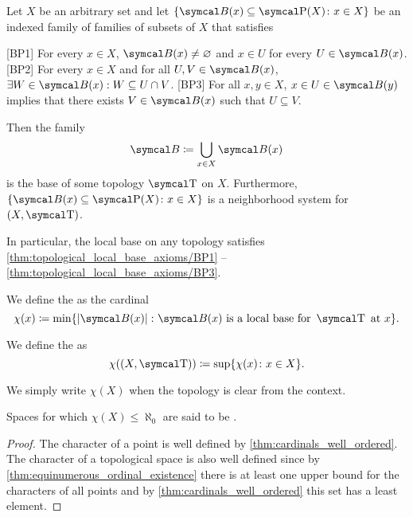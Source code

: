 \begin{proposition}\label{thm:topological_local_base_axioms}\cite[13]{Engelking1989}
  Let \( X \) be an arbitrary set and let \( \{ \Cal{B}(x) \subseteq \Power(X) \colon x \in X \} \) be an indexed family of families of subsets of \( X \) that satisfies
  \begin{description}
    [BP1] For every \( x \in X \), \( \Cal{B}(x) \neq \varnothing \) and \( x \in U \) for every \( U \in \Cal{B}(x) \).
    [BP2] For every \( x \in X \) and for all \( U, V \in \Cal{B}(x) \), \( \exists W \in \Cal{B}(x): W \subseteq U \cap V \).
    [BP3] For all \( x, y \in X \), \( x \in U \in \Cal{B}(y) \) implies that there exists \( V \in \Cal{B}(x) \) such that \( U \subseteq V \).
  \end{description}

  Then the family
  \begin{equation*}
    \Cal{B} \coloneqq \bigcup_{x \in X} \Cal{B}(x)
  \end{equation*}
  is the base of some topology \( \CT \) on \( X \). Furthermore, \( \{ \Cal{B}(x) \subseteq \Power(X) \colon x \in X \} \) is a neighborhood system for \( (X, \CT) \).

  In particular, the local base on any topology satisfies \cref{thm:topological_local_base_axioms/BP1} -- \cref{thm:topological_local_base_axioms/BP3}.
\end{proposition}

\begin{definition}\label{def:topological_space_character}
  We define the  as the cardinal
  \begin{equation*}
    \chi(x) \coloneqq \min \{ \Abs{\Cal{B(x)}} \colon \Cal{B(x)} \text{ is a local base for } \CT \text{ at } x \}.
  \end{equation*}

  We define the  as
  \begin{equation*}
    \chi((X, \CT)) \coloneqq \sup \{ \chi(x) \colon x \in X \}.
  \end{equation*}

  We simply write \( \chi(X) \) when the topology is clear from the context.

  Spaces for which \( \chi(X) \leq \aleph_0 \) are said to be .
\end{definition}
\begin{proof}
  The character of a point is well defined by \cref{thm:cardinals_well_ordered}. The character of a topological space is also well defined since by \cref{thm:equinumerous_ordinal_existence} there is at least one upper bound for the characters of all points and by \cref{thm:cardinals_well_ordered} this set has a least element.
\end{proof}


